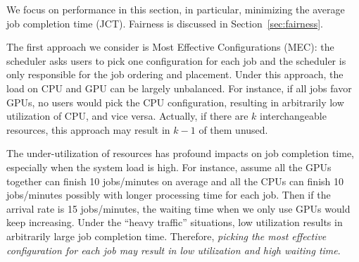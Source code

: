 We focus on performance in this section, in particular, minimizing the average job completion time (JCT). Fairness is discussed in Section~\ref{sec:fairness}.  




The first approach we consider is Most Effective Configurations (MEC): the scheduler asks users to pick one configuration for each job and the scheduler is only responsible for the job ordering and placement. 
Under this approach, the load on CPU and GPU can be largely unbalanced. For instance, if all jobs favor GPUs, no users would pick the CPU configuration, resulting in arbitrarily low utilization of CPU, and vice versa. 
Actually, if there are $k$ interchangeable resources, this approach may result in $k-1$ of them unused. 

The under-utilization of resources has profound impacts on job completion time, especially when the system load is high. For instance, assume all the GPUs together can finish 10 jobs/minutes on average and all the CPUs can finish 10 jobs/minutes possibly with longer processing time for each job. Then if the arrival rate is 15 jobs/minutes, the waiting time when we only use GPUs would keep increasing. Under the ``heavy traffic'' situations, low utilization results in arbitrarily large job completion time. 
Therefore, \emph{picking the most effective configuration for each job may result in low utilization and high waiting time}.


